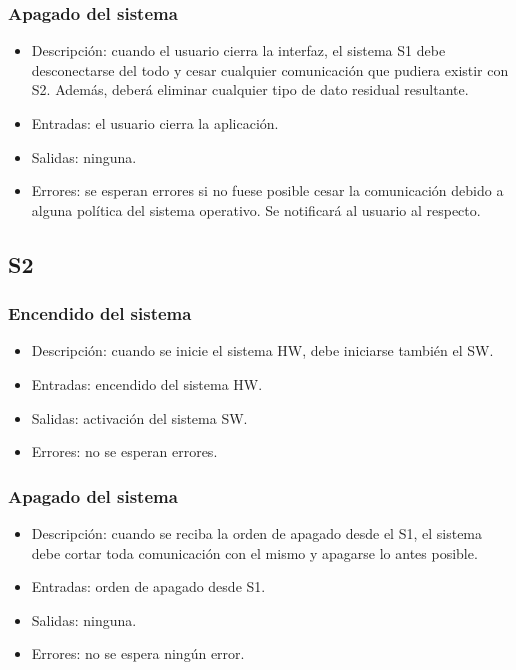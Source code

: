 \subsubsection{Apagado del sistema}
\begin{itemize}
    \item Descripción: cuando el usuario cierra la interfaz, el sistema \ac{S1} debe desconectarse del todo y cesar cualquier comunicación que pudiera existir con \ac{S2}. Además, deberá eliminar cualquier tipo de dato residual resultante.
    \item Entradas: el usuario cierra la aplicación.
    \item Salidas: ninguna.
    \item Errores: se esperan errores si no fuese posible cesar la comunicación debido a alguna política del sistema operativo. Se notificará al usuario al respecto.
\end{itemize}

\subsection*{\ac{S2}} 
\subsubsection{Encendido del sistema}
\begin{itemize}
    \item Descripción: cuando se inicie el sistema \ac{HW}, debe iniciarse también el \ac{SW}.
    \item Entradas: encendido del sistema \ac{HW}.
    \item Salidas: activación del sistema \ac{SW}.
    \item Errores: no se esperan errores.
\end{itemize}

\subsubsection{Apagado del sistema}
\begin{itemize}
    \item Descripción: cuando se reciba la orden de apagado desde el \ac{S1}, el sistema debe cortar toda comunicación con el mismo y apagarse lo antes posible.
    \item Entradas: orden de apagado desde \ac{S1}.
    \item Salidas: ninguna.
    \item Errores: no se espera ningún error.
\end{itemize}

